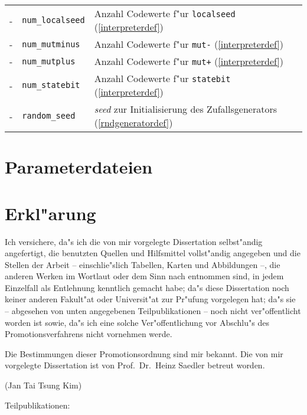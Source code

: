 \begin{appendix}
\begin{tabularx}{\linewidth}{|c|l|X|}
-            & \verb|num_localseed|     & Anzahl Codewerte f"ur \verb|localseed| (\ref{interpreterdef}) \\
-            & \verb|num_mutminus|      & Anzahl Codewerte f"ur \verb|mut-| (\ref{interpreterdef}) \\
-            & \verb|num_mutplus|       & Anzahl Codewerte f"ur \verb|mut+| (\ref{interpreterdef}) \\
-            & \verb|num_statebit|      & Anzahl Codewerte f"ur \verb|statebit| (\ref{interpreterdef}) \\
-            & \verb|random_seed|       & {\slshape seed} zur Initialisierung des Zufallsgenerators (\ref{rndgeneratordef}) \\ \hline
\end{tabularx}


\chapter{Parameterdateien}
\label{paramfile-appendix}


\chapter{Erkl"arung}

Ich versichere, da"s ich die von mir vorgelegte Dissertation selbst"andig angefertigt, die benutzten Quellen
und Hilfsmittel vollst"andig angegeben und die Stellen der Arbeit -- einschlie"slich Tabellen, Karten und
Abbildungen --, die anderen Werken im Wortlaut oder dem Sinn nach entnommen sind, in jedem Einzelfall
als Entlehnung kenntlich gemacht habe; da"s diese Dissertation noch keiner anderen Fakult"at oder Universit"at
zur Pr"ufung vorgelegen hat; da"s sie -- abgesehen von unten angegebenen Teilpublikationen --
noch nicht ver"offentlicht worden ist sowie, da"s ich eine solche Ver"offentlichung vor Abschlu"s des
Promotionsverfahrens nicht vornehmen werde.

Die Bestimmungen dieser Promotionsordnung sind mir bekannt. Die von mir vorgelegte Dissertation ist von
Prof.\ Dr.\ Heinz Saedler betreut worden.

\vspace*{3cm}
\noindent (Jan Tai Tsung Kim)

\vspace*{1cm}

\noindent Teilpublikationen:

\begin{itemize}


\end{itemize}
\end{appendix}
